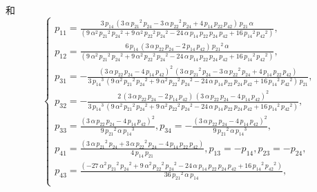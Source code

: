 和
\begin{equation}
\renewcommand{\arraystretch}{1.2}
\left\{
\begin{array}{l}
{{p}_{11}}=\frac{3\,{{p}_{14}}\,\left( 3\,\alpha\,{{{p}_{21}}}^{2}\,{{p}_{24}}-3\,\alpha\,{{{p}_{22}}}^{2}\,{{p}_{24}}+4\,{{p}_{14}}\,{{p}_{22}}\,{{p}_{42}}\right) \,{{p}_{21}}\,\alpha}{\left( 9\,{\alpha}^{2}\,{{{p}_{21}}}^{2}\,{{{p}_{24}}}^{2}+9\,{\alpha}^{2}\,{{{p}_{22}}}^{2}\,{{{p}_{24}}}^{2}-24\,\alpha\,{{p}_{14}}\,{{p}_{22}}\,{{p}_{24}}\,{{p}_{42}}+16\,{{{p}_{14}}}^{2}\,{{{p}_{42}}}^{2}\right) },\\ 
{{p}_{12}}=\frac{6\,{{p}_{14}}\,\left( 3\,\alpha\,{{p}_{22}}\,{{p}_{24}}-2\,{{p}_{14}}\,{{p}_{42}}\right) \,{{{p}_{21}}}^{2}\,\alpha}{\left( 9\,{\alpha}^{2}\,{{{p}_{21}}}^{2}\,{{{p}_{24}}}^{2}+9\,{\alpha}^{2}\,{{{p}_{22}}}^{2}\,{{{p}_{24}}}^{2}-24\,\alpha\,{{p}_{14}}\,{{p}_{22}}\,{{p}_{24}}\,{{p}_{42}}+16\,{{{p}_{14}}}^{2}\,{{{p}_{42}}}^{2}\right) },\\
{{p}_{31}}=-\frac{\left( 3\,\alpha\,{{p}_{22}}\,{{p}_{24}}-4\,{{p}_{14}}\,{{p}_{42}}\right) ^{2}\,\left( 3\,\alpha\,{{{p}_{21}}}^{2}\,{{p}_{24}}-3\,\alpha\,{{{p}_{22}}}^{2}\,{{p}_{24}}+4\,{{p}_{14}}\,{{p}_{22}}\,{{p}_{42}}\right) }{3\,{{{p}_{14}}}^{3}\,\left( 9\,{\alpha}^{2}\,{{{p}_{21}}}^{2}\,{{{p}_{24}}}^{2}+9\,{\alpha}^{2}\,{{{p}_{22}}}^{2}\,{{{p}_{24}}}^{2}-24\,\alpha\,{{p}_{14}}\,{{p}_{22}}\,{{p}_{24}}\,{{p}_{42}}+16\,{{{p}_{14}}}^{2}\,{{{p}_{42}}}^{2}\right) \,{{p}_{21}}},\\
{{p}_{32}}=-\frac{2\,\left( 3\,\alpha\,{{p}_{22}}\,{{p}_{24}}-2\,{{p}_{14}}\,{{p}_{42}}\right) \,\left( 3\,\alpha\,{{p}_{22}}\,{{p}_{24}}-4\,{{p}_{14}}\,{{p}_{42}}\right) ^{2}}{3\,{{{p}_{14}}}^{3}\,\left( 9\,{\alpha}^{2}\,{{{p}_{21}}}^{2}\,{{{p}_{24}}}^{2}+9\,{\alpha}^{2}\,{{{p}_{22}}}^{2}\,{{{p}_{24}}}^{2}-24\,\alpha\,{{p}_{14}}\,{{p}_{22}}\,{{p}_{24}}\,{{p}_{42}}+16\,{{{p}_{14}}}^{2}\,{{{p}_{42}}}^{2}\right) },\\ 
{{p}_{33}}=\frac{\left( 3\,\alpha\,{{p}_{22}}\,{{p}_{24}}-4\,{{p}_{14}}\,{{p}_{42}}\right) ^{2}}{9\,{{{p}_{21}}}^{2}\,\alpha\,{{{p}_{14}}}^{3}},
{{p}_{34}}=-\frac{\left( 3\,\alpha\,{{p}_{22}}\,{{p}_{24}}-4\,{{p}_{14}}\,{{p}_{42}}\right) ^{2}}{9\,{{{p}_{21}}}^{2}\,\alpha\,{{{p}_{14}}}^{3}},\\ 
{{p}_{41}}=\frac{\left( 3\,\alpha\,{{{p}_{21}}}^{2}\,{{p}_{24}}+3\,\alpha\,{{{p}_{22}}}^{2}\,{{p}_{24}}-4\,{{p}_{14}}\,{{p}_{22}}\,{{p}_{42}}\right) }{4\,{{p}_{14}}\,{{p}_{21}}},
{{p}_{13}}=-{{p}_{14}},
{{p}_{23}}=-{{p}_{24}},\\ 
{{p}_{43}}=\frac{\left( -27\,{\alpha}^{2}\,{{{p}_{21}}}^{2}\,{{{p}_{24}}}^{2}+9\,{\alpha}^{2}\,{{{p}_{22}}}^{2}\,{{{p}_{24}}}^{2}-24\,\alpha\,{{p}_{14}}\,{{p}_{22}}\,{{p}_{24}}\,{{p}_{42}}+16\,{{{p}_{14}}}^{2}\,{{{p}_{42}}}^{2}\right) }{36\,{{{p}_{21}}}^{2}\,\alpha\,{{p}_{14}}},\\ 

\end{array}
\end{equation}
